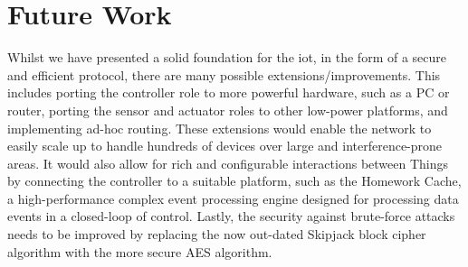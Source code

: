 \documentclass[conference]{./sty/IEEEtran}
\begin{document}
\section{Future Work} %
\label{sec:future_work}
Whilst we have presented a solid foundation for the iot, in the form of a secure and efficient protocol, there are many possible extensions/improvements. This includes porting the controller role to more powerful hardware, such as a PC or router, porting the sensor and actuator roles to other low-power platforms, and implementing ad-hoc routing. These extensions would enable the network to easily scale up to handle hundreds of devices over large and interference-prone areas. It would also allow for rich and configurable interactions between Things by connecting the controller to a suitable platform, such as the Homework Cache\cite{Cache}, a high-performance complex event processing engine designed for processing data events in a closed-loop of control. Lastly, the security against brute-force attacks needs to be improved by replacing the now out-dated Skipjack block cipher algorithm with the more secure AES algorithm\cite{NIST}.






%
%
%






\end{document}
